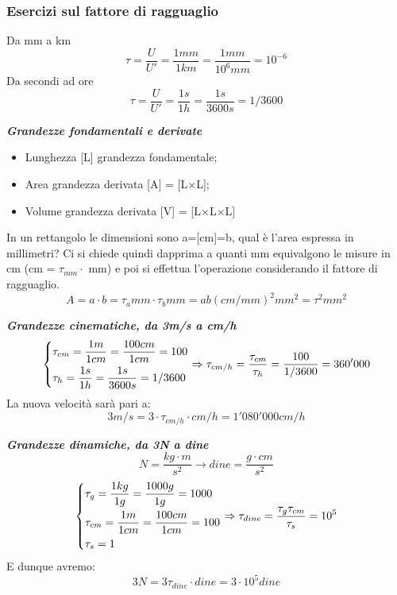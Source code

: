 \documentclass[a4paper, 15pt]{article}
\begin{document}
\subsubsection{Esercizi sul fattore di ragguaglio} 

	Da mm a km
	\[\tau = \dfrac{U}{U'} = \dfrac{1mm}{1km} = \dfrac{1mm}{10^6mm}= 10^{-6}\]
	Da secondi ad ore
	\[\tau = \dfrac{U}{U'} = \dfrac{1s}{1h} = \dfrac{1s}{3600s}= 1/3600\]
	
	
\textit{\textbf{Grandezze fondamentali e  derivate}} 
	\begin{itemize}
		\item Lunghezza [L] grandezza fondamentale;
		\item Area grandezza derivata [A] = [L$\times$L];
		\item Volume grandezza derivata [V] = [L$\times$L$\times$L]
	\end{itemize}
	In un rettangolo le dimensioni sono a=[cm]=b, qual è l'area espressa in millimetri? Ci si chiede quindi dapprima a quanti mm equivalgono le misure in cm (cm = $\tau_{mm} \cdot$ mm) e poi si effettua l'operazione considerando il fattore di ragguaglio. 
	\[A = a\cdot b =\tau_a mm \cdot \tau_b mm =ab (cm/mm)^2 mm^2 = \tau^2 mm^2 \]
	
	\textbf{\textit{Grandezze cinematiche, da 3m/s a cm/h}} 
	\[ \begin{dcases}
		\tau_{cm} = \dfrac{1m}{1cm} = \dfrac{100cm}{1cm} = 100 \\
		\tau_h = \dfrac{1s}{1h} = \dfrac{1s}{3600s} = 1/3600
	\end{dcases} \Rightarrow \tau_{cm/h} = \dfrac{\tau_{cm}}{\tau_h} = \dfrac{100}{1/3600} = 360'000 \]
	La nuova velocità sarà pari a:
	\[ 3m/s = 3 \cdot \tau_{cm/h} \cdot cm/h = 1'080'000 cm/h \]
	
	 \textbf{\textit{Grandezze dinamiche, da 3N a dine}} 
	 \[ N = \dfrac{kg\cdot m}{s^2} \rightarrow dine = \dfrac{g\cdot cm}{s^2} \]
	\[ \begin{dcases}
		\tau_g = \dfrac{1kg}{1g} = \dfrac{1000g}{1g} = 1000 \\
		\tau_{cm} = \dfrac{1m}{1cm} = \dfrac{100cm}{1cm} = 100 \\
		\tau_s = 1
	\end{dcases} \Rightarrow \tau_{dine} = \dfrac{\tau_g\tau_{cm}}{\tau_s} = 10^5 \]
	E dunque avremo:
	\[ 3N = 3\tau_{dine} \cdot dine= 3\cdot 10^5 dine\]
	
\end{document}
